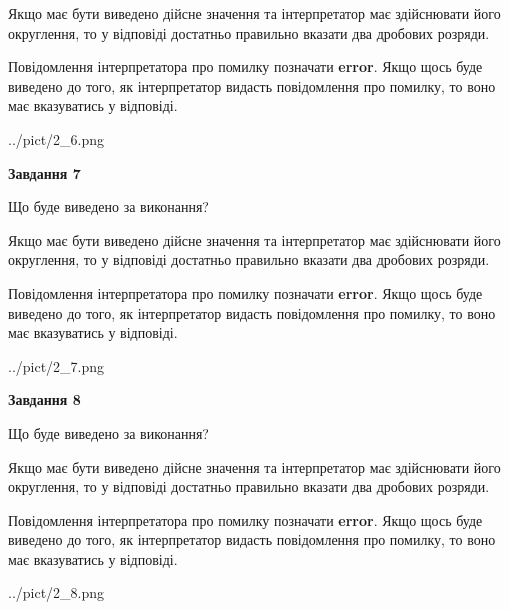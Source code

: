 \documentclass[12pt, ukrainian]{article}
\begin{document}
{\begin {Large}
Якщо має бути виведено дійсне значення та інтерпретатор має здійснювати його округлення, 
то у відповіді достатньо правильно вказати два дробових розряди.

Повідомлення інтерпретатора про помилку позначати \textbf{error}.
Якщо щось буде виведено до того, як інтерпретатор видасть повідомлення про помилку, 
то воно має вказуватись у відповіді. \par

\begin{center}
	{../pict/2_6.png}
\end{center}
\newpage

{\begin {center}\textbf{Завдання 7}\end {center}}\par
Що буде виведено за виконання? \par

Якщо має бути виведено дійсне значення та інтерпретатор має здійснювати його округлення, 
то у відповіді достатньо правильно вказати два дробових розряди.

Повідомлення інтерпретатора про помилку позначати \textbf{error}.
Якщо щось буде виведено до того, як інтерпретатор видасть повідомлення про помилку, 
то воно має вказуватись у відповіді. \par

\begin{center}
	{../pict/2_7.png}
\end{center}
\newpage

{\begin {center}\textbf{Завдання 8}\end {center}}\par
Що буде виведено за виконання? \par

Якщо має бути виведено дійсне значення та інтерпретатор має здійснювати його округлення, 
то у відповіді достатньо правильно вказати два дробових розряди.

Повідомлення інтерпретатора про помилку позначати \textbf{error}.
Якщо щось буде виведено до того, як інтерпретатор видасть повідомлення про помилку, 
то воно має вказуватись у відповіді. \par

\begin{center}
	{../pict/2_8.png}
\end{center}
\newpage


\end{Large}}
\end{document}
